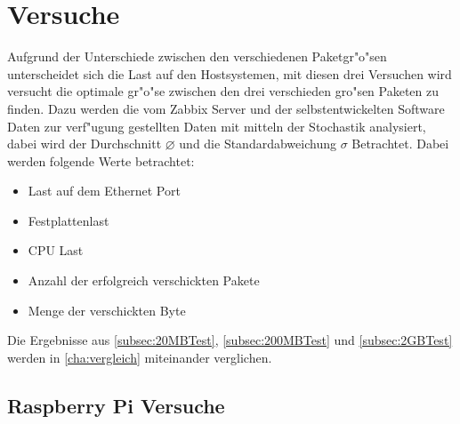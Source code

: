 \chapter{Versuche}
\label{cha:versuche}
Aufgrund der Unterschiede zwischen den verschiedenen Paketgr"o"sen unterscheidet sich die Last auf den Hostsystemen, %
mit diesen drei Versuchen wird versucht die optimale gr"o"se zwischen den drei verschieden gro"sen Paketen zu finden. %
Dazu werden die vom Zabbix Server und der selbstentwickelten Software Daten zur verf"ugung gestellten %
Daten mit mitteln der Stochastik analysiert, dabei wird der Durchschnitt $\diameter $ und die Standardabweichung $\sigma $
Betrachtet. Dabei werden folgende Werte betrachtet:  %
\begin{itemize}
\item Last auf dem Ethernet Port
\item Festplattenlast
\item CPU Last 
\item Anzahl der erfolgreich verschickten Pakete
\item Menge der verschickten Byte
\end{itemize}

Die Ergebnisse aus \cref{subsec:20MBTest}, \cref{subsec:200MBTest} und \cref{subsec:2GBTest} werden %
in \cref{cha:vergleich} miteinander verglichen. %

\section{Raspberry Pi Versuche}
\label{sec:raspberryPiVersuche}





